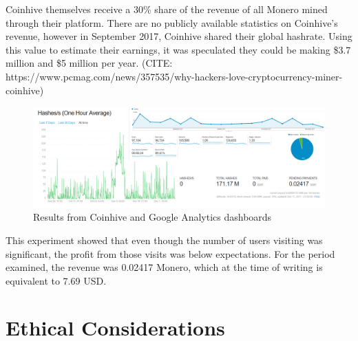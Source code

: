 Coinhive themselves receive a 30\% share of the revenue of all Monero mined through their platform. There are no publicly available statistics on Coinhive's revenue, however in September 2017, Coinhive shared their global hashrate. Using this value to estimate their earnings, it was speculated they could be making \$3.7 million and \$5 million per year. (CITE: https://www.pcmag.com/news/357535/why-hackers-love-cryptocurrency-miner-coinhive)



\begin{figure}[t]
\centering
\includegraphics[width=\linewidth]{figures/coinhive_experiment_11k.png}
\caption{Results from Coinhive and Google Analytics dashboards}
\end{figure}

This experiment showed that even though the number of users visiting was significant, the profit from those visits was below expectations. For the period examined, the revenue was 0.02417 Monero, which at the time of writing is equivalent to 7.69 USD.




\section{Ethical Considerations}

